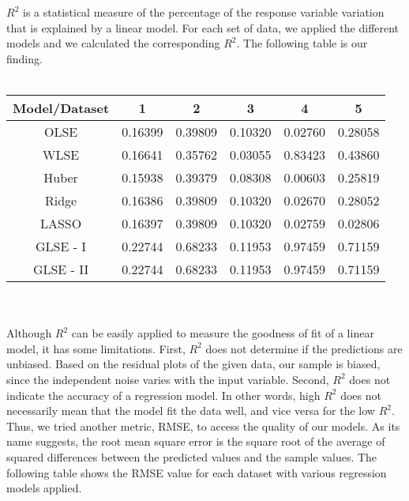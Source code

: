 \documentclass[letter,12pt]{article} %
\begin{document}
	$R^2$ is a statistical measure of the percentage of the response variable variation that is explained by a linear model. For each set of data, we applied the different models and we calculated the corresponding $R^2$. The following table is our finding.
	\\\\
	\begin{tabular}{|c||c|c|c|c|c|}
		\hline 
		Model/Dataset   &1  &2  &3& 4   &5  \\ 
		\hline 
		OLSE &  0.16399 & 0.39809 & 0.10320 & 0.02760 & 0.28058  \\ 
		\hline 
		WLSE &  0.16641 & 0.35762 & 0.03055 & 0.83423 & 0.43860  \\ 
		\hline 
		Huber & 0.15938 &   0.39379 &   0.08308 &   0.00603 & 0.25819 \\ 
		\hline 
		Ridge&0.16386&0.39809&0.10320&0.02670&0.28052  \\ 
		\hline 
		LASSO&0.16397&0.39809&0.10320&0.02759&0.02806  \\ 
		\hline 
		GLSE - I &0.22744&0.68233&0.11953&0.97459&0.71159  \\ 
		\hline 
		GLSE - II &0.22744&0.68233&0.11953&0.97459&0.71159   \\ 
		\hline 
	\end{tabular} 
	\\\\
	Although $R^2$ can be easily applied to measure the goodness of fit of a linear model, it has some limitations. First, $R^2$ does not determine if the predictions are unbiased. Based on the residual plots of the given data, our sample is biased, since the independent noise varies with the input variable. Second, $R^2$ does not indicate the accuracy of a regression model. In other words, high $R^2$ does not necessarily mean that the model fit the data well, and vice versa for the low $R^2$. Thus, we tried another metric, RMSE, to access the quality of our models. As its name suggests, the root mean square error is the square root of the average of squared differences between the predicted values and the sample values. The following table shows the RMSE value for each dataset with various regression models applied.
	\\\\
\end{document}

